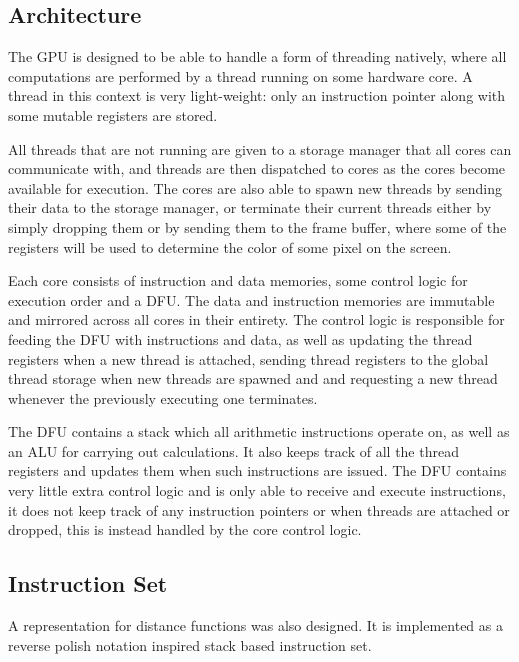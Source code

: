 		\subsection{Architecture}

			The GPU is designed to be able to handle a form of threading
			natively, where all computations are performed by a thread running
			on some hardware core. A thread in this context is very
			light-weight: only an instruction pointer along with some mutable
			registers are stored.

			All threads that are not running are given to a storage manager that all cores can communicate with, and threads are then
			dispatched to cores as the cores become available for execution.
			The cores are also able to spawn new threads by sending their data
			to the storage manager, or terminate their current threads either 
			by simply dropping them or by sending them to the frame buffer, 
			where some of the registers will be used to determine the color of 
			some pixel on the screen.

			Each core consists of instruction and data memories, some control 
			logic for execution order and a DFU. The data and instruction 
			memories are immutable and mirrored across all cores in their 
			entirety. The control logic is responsible for feeding the DFU with
			instructions and data, as well as updating the thread registers 
			when a new thread is attached, sending thread registers to the 
			global thread storage when new threads are spawned and and 
			requesting a new thread whenever the previously executing one 
			terminates.
			
			The DFU contains a stack which all arithmetic instructions operate
			on, as well as an ALU for carrying out calculations. It also keeps
			track of all the thread registers and updates them when such
			instructions are issued. The DFU contains very little extra control
			logic and is only able to receive and execute instructions, it does
			not keep track of any instruction pointers or when threads are
			attached or dropped, this is instead handled by the core control
			logic.

		\subsection{Instruction Set}

			A representation for distance functions was also designed. It is
			implemented as a reverse polish notation inspired stack based 
			instruction set.

